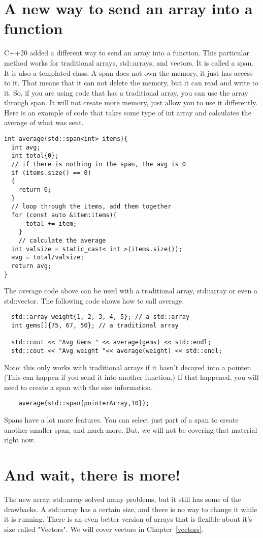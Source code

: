 \section{A new way to send an array into a function}
C++20 added a different way to send an array into a function. This particular
method works for traditional arrays, std::arrays, and vectors. It is called
a span. It is also a templated class.
A span does not own the memory, it just has access to it. That means that
it can not delete the memory, but it can read and write to it. So, if
you are using code that has a traditional array, you can use the array
through span. It will not create more memory, just allow you to use it
differently. Here is an example of code that takes some type of int array
and calculates the average of what was sent.
\begin{lstlisting}
int average(std::span<int> items){
  int avg;
  int total{0};
  // if there is nothing in the span, the avg is 0
  if (items.size() == 0)
  {
    return 0;
  }
  // loop through the items, add them together
  for (const auto &item:items){
      total += item;
    }
    // calculate the average
  int valsize = static_cast< int >(items.size());
  avg = total/valsize;
  return avg;
}
\end{lstlisting}
The average code above can be used with a traditional array, std::array or even a 
std::vector. The following code shows how to call average.
\begin{lstlisting}
  std::array weight{1, 2, 3, 4, 5}; // a std::array
  int gems[]{75, 67, 50}; // a traditional array
 
  std::cout << "Avg Gems " << average(gems) << std::endl;
  std::cout << "Avg weight "<< average(weight) << std::endl;    
\end{lstlisting}
Note: this only works with traditional arrays if it hasn't decayed into a pointer.
(This can happen if you send it into another function.) If that happened, you will 
need to create a span with the size information.
\begin{lstlisting}
    average(std::span{pointerArray,10});
\end{lstlisting}
Spans have a lot more features. You can select just part of a span to create
another smaller span, and much more. But, we will not be covering that material
right now.
\section{And wait, there is more!}
The new array, std::array solved many problems, but it
still has some of the drawbacks. A std::array has a certain 
size, and there is no way to change it while it is running. There is an even better version of arrays that is flexible about it's size called "Vectors". We will cover vectors in Chapter~\ref{vectors}.